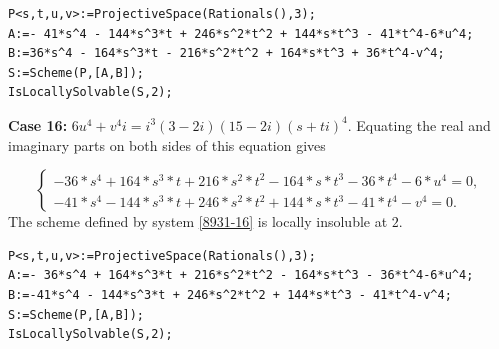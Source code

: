 \documentclass[a4paper,12pt,english,reqno]{amsart}
\begin{document}
\begin{lstlisting}
P<s,t,u,v>:=ProjectiveSpace(Rationals(),3);
A:=- 41*s^4 - 144*s^3*t + 246*s^2*t^2 + 144*s*t^3 - 41*t^4-6*u^4;
B:=36*s^4 - 164*s^3*t - 216*s^2*t^2 + 164*s*t^3 + 36*t^4-v^4;
S:=Scheme(P,[A,B]);
IsLocallySolvable(S,2);
\end{lstlisting}


{\bf Case 16:} $6u^4+v^4i=i^3(3-2i)(15-2i)(s+ti)^4$.  Equating the real and imaginary parts on both sides of this equation gives

\begin{equation}\label{8931-16}
\begin{cases}
-36*s^4 + 164*s^3*t + 216*s^2*t^2 - 164*s*t^3 - 36*t^4 - 6*u^4=0,\\
-41*s^4 - 144*s^3*t + 246*s^2*t^2 + 144*s*t^3 - 41*t^4 - v^4=0.
\end{cases}
\end{equation}
The scheme defined by system \eqref{8931-16} is locally insoluble at $2$.

\begin{lstlisting}
P<s,t,u,v>:=ProjectiveSpace(Rationals(),3);
A:=- 36*s^4 + 164*s^3*t + 216*s^2*t^2 - 164*s*t^3 - 36*t^4-6*u^4;
B:=-41*s^4 - 144*s^3*t + 246*s^2*t^2 + 144*s*t^3 - 41*t^4-v^4;
S:=Scheme(P,[A,B]);
IsLocallySolvable(S,2);
\end{lstlisting}
\end{document}
